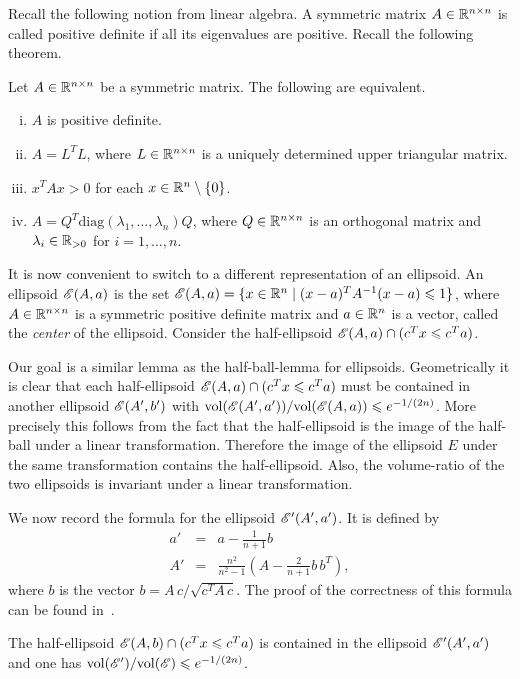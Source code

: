 Recall the following notion from linear algebra. A symmetric matrix $A
\in \mathbb{R}^{n\times n}$ is called positive definite if all its eigenvalues are
positive.  Recall the following theorem. 
\begin{theorem}
  \label{el:thr:22}
  Let $A \in \mathbb{R}^{n\times n}$ be a symmetric matrix. The following are
  equivalent. 
  \begin{enumerate}[i)]
  \item $A$ is positive definite. 
  \item $A = L^TL $, where $L\in \mathbb{R}^{n\times n} $ is a uniquely determined upper
    triangular matrix. 
  \item $x^TAx>0$ for each $x \in \mathbb{R}^n \setminus\{0\}$. 
  \item $A = Q^T \textrm{diag}(\lambda_1,\ldots,\lambda_n) Q$, where $Q \in \mathbb{R}^{n\times n}$ is an
    orthogonal matrix and $\lambda_i \in \mathbb{R}_{>0}$ for $i=1,\ldots,n$. 
  \end{enumerate}
\end{theorem}


It is now convenient to switch to a different representation of an
ellipsoid. An ellipsoid $\mathscr{E}(A,a)$ is the set  $\mathscr{E}(A,a) = \{ x \in \mathbb{R}^n \mid
(x-a)^TA^{-1}(x-a)\leqslant 1\}$, where $A \in \mathbb{R}^{n\times n}$ is a symmetric positive
definite matrix and $a\in \mathbb{R}^n$ is a vector, called the 
\emph{center} of the ellipsoid.  Consider the half-ellipsoid
$\mathscr{E}(A,a) \cap (c^Tx\leqslant c^Ta)$.

Our goal is a similar lemma as the half-ball-lemma for ellipsoids.
Geometrically it is clear that each half-ellipsoid $\mathscr{E}(A,a) \cap
(c^Tx\leqslant c^Ta)$ must be contained in another ellipsoid $\mathscr{E}(A',b')$
with $\mathrm{vol}(\mathscr{E}(A',a'))/ \mathrm{vol}(\mathscr{E}(A,a))\leqslant e^{-1/(2n)}$.  More precisely
this follows from the fact that the half-ellipsoid is the image of the
half-ball under a linear transformation. Therefore the image of the
ellipsoid $E$ under the same transformation contains the
half-ellipsoid.  Also, the volume-ratio of the two ellipsoids is
invariant under a linear transformation.


We now record the formula for the ellipsoid $\mathscr{E}'(A',a')$. 
It is defined by 
\begin{eqnarray}
  \label{el:eq:20}
  a' &  = & a - \frac{1}{n+1}b \\
  A' & = & \frac{n^2}{n^2-1}\left( A - \frac{2}{n+1}b\, b^T   \right),
\end{eqnarray}
where $b$ is the vector $b = A\, c/ \sqrt{c^TA\,c} $.  
The proof of the correctness of this formula  can be found
in~\cite{GroetschelLovaszSchrijver88}.  
\begin{lemma}
  \label{el:thr:20}
  The half-ellipsoid $\mathscr{E}(A,b) \cap (c^Tx\leqslant c^Ta)$ is contained in the
  ellipsoid $\mathscr{E}'(A',a')$ and one has $\mathrm{vol}(\mathscr{E}')/
  \mathrm{vol}(\mathscr{E})\leqslant e^{-1/(2n)}$. 
\end{lemma}



